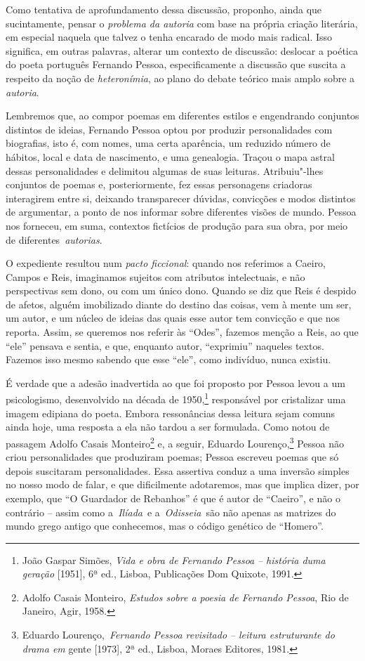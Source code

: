 Como tentativa de aprofundamento dessa discussão, proponho, ainda que
sucintamente, pensar o \emph{problema da autoria} com base na própria
criação literária, em especial naquela que talvez o tenha encarado de
modo mais radical. Isso significa, em outras palavras, alterar um
contexto de discussão: deslocar a poética do poeta português Fernando
Pessoa, especificamente a discussão que suscita a respeito da noção de
\emph{heteronímia}, ao plano do debate teórico mais amplo sobre a
\emph{autoria}.

Lembremos que, ao compor poemas em diferentes estilos e engendrando
conjuntos distintos de ideias, Fernando Pessoa optou por produzir
personalidades com biografias, isto é, com nomes, uma certa aparência,
um reduzido número de hábitos, local e data de nascimento, e uma
genealogia. Traçou o mapa astral dessas personalidades e delimitou
algumas de suas leituras. Atribuiu"-lhes conjuntos de poemas e,
posteriormente, fez essas personagens criadoras interagirem entre si,
deixando transparecer dúvidas, convicções e modos distintos de
argumentar, a ponto de nos informar sobre diferentes visões de mundo.
Pessoa nos forneceu, em suma, contextos fictícios de produção para sua
obra, por meio de diferentes~\emph{autorias}.

O expediente resultou num \emph{pacto ficcional}: quando nos referimos a
Caeiro, Campos e Reis, imaginamos sujeitos com atributos intelectuais, e
não perspectivas sem dono, ou com um único dono. Quando se diz que Reis
é despido de afetos, alguém imobilizado diante do destino das coisas,
vem à mente um ser, um autor, e um núcleo de ideias das quais esse autor
tem convicção e que nos reporta. Assim, se queremos nos referir às
``Odes'', fazemos menção a Reis, ao que ``ele'' pensava e sentia, e que,
enquanto autor, ``exprimiu'' naqueles textos. Fazemos isso mesmo sabendo
que esse ``ele'', como indivíduo, nunca existiu.

É verdade que a adesão inadvertida ao que foi proposto por Pessoa levou
a um psicologismo, desenvolvido na década de 1950,\footnote{João Gaspar
  Simões, \emph{Vida e obra de Fernando Pessoa} \emph{-- história duma
  geração} {[}1951{]}, 6ª ed., Lisboa, Publicações Dom Quixote, 1991.}
responsável por cristalizar uma imagem edipiana do poeta. Embora
ressonâncias dessa leitura sejam comuns ainda hoje, uma resposta a ela
não tardou a ser formulada. Como notou de passagem Adolfo Casais
Monteiro\footnote{Adolfo Casais Monteiro, \emph{Estudos sobre a poesia
  de Fernando Pessoa}, Rio de Janeiro, Agir, 1958.} e, a seguir, Eduardo
Lourenço,\footnote{Eduardo Lourenço,~\emph{Fernando Pessoa revisitado}
  \emph{-- leitura estruturante do drama em} gente {[}1973{]}, 2ª ed.,
  Lisboa, Moraes Editores, 1981.} Pessoa não criou personalidades que
produziram poemas; Pessoa escreveu poemas que só depois suscitaram
personalidades. Essa assertiva conduz a uma inversão simples no nosso
modo de falar, e que dificilmente adotaremos, mas que implica dizer, por
exemplo, que ``O Guardador de Rebanhos'' é que é autor de ``Caeiro'', e
não o contrário -- assim como a\emph{~Ilíada}~e a~\emph{Odisseia}~são
não apenas as matrizes do mundo grego antigo que conhecemos, mas o
código genético de ``Homero''.

